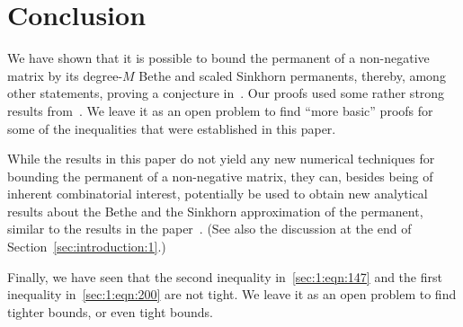 \documentclass[journal,lettersize,twocolumn]{IEEEtran} %
\begin{document}
\section{Conclusion}
\label{sec:7}

%

We have shown that it is possible to bound the permanent of a non-negative
matrix by its degree-$M$ Bethe and scaled Sinkhorn permanents, thereby, among
other statements, proving a conjecture in~\cite{Vontobel2013a}. Our proofs
used some rather strong results from~\cite{Schrijver1998, Gurvits2011,
  Anari2019, Egorychev1981, Falikman1981}. We leave it as an open problem to
find ``more basic'' proofs for some of the inequalities that were established
in this paper.

%

While the results in this paper do not yield any new numerical techniques for
bounding the permanent of a non-negative matrix, they can, besides being of
inherent combinatorial interest, potentially be used to obtain new analytical
results about the Bethe and the Sinkhorn approximation of the permanent,
similar to the results in the paper~\cite{KitShing2022}. (See also the
discussion at the end of Section~\ref{sec:introduction:1}.)

%

Finally, we have seen that the second inequality in~\eqref{sec:1:eqn:147} and
the first inequality in~\eqref{sec:1:eqn:200} are not tight. We leave it as an
open problem to find tighter bounds, or even tight bounds.

%
%

\ifx\withclearpagecommands\x
\clearpage
\fi
\end{document}
